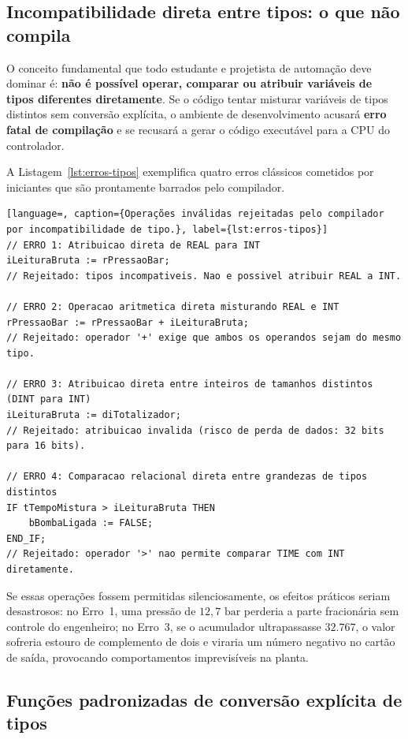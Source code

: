 \subsection{Incompatibilidade direta entre tipos: o que não compila}

O conceito fundamental que todo estudante e projetista de automação deve dominar é: \textbf{não é
possível operar, comparar ou atribuir variáveis de tipos diferentes diretamente}. Se o código tentar
misturar variáveis de tipos distintos sem conversão explícita, o ambiente de desenvolvimento
acusará \textbf{erro fatal de compilação} e se recusará a gerar o código executável para a CPU do
controlador.

A Listagem~\ref{lst:erros-tipos} exemplifica quatro erros clássicos cometidos por iniciantes que
são prontamente barrados pelo compilador.

\begin{lstlisting}[language=, caption={Operações inválidas rejeitadas pelo compilador por incompatibilidade de tipo.}, label={lst:erros-tipos}]
// ERRO 1: Atribuicao direta de REAL para INT
iLeituraBruta := rPressaoBar;
// Rejeitado: tipos incompativeis. Nao e possivel atribuir REAL a INT.

// ERRO 2: Operacao aritmetica direta misturando REAL e INT
rPressaoBar := rPressaoBar + iLeituraBruta;
// Rejeitado: operador '+' exige que ambos os operandos sejam do mesmo tipo.

// ERRO 3: Atribuicao direta entre inteiros de tamanhos distintos (DINT para INT)
iLeituraBruta := diTotalizador;
// Rejeitado: atribuicao invalida (risco de perda de dados: 32 bits para 16 bits).

// ERRO 4: Comparacao relacional direta entre grandezas de tipos distintos
IF tTempoMistura > iLeituraBruta THEN
    bBombaLigada := FALSE;
END_IF;
// Rejeitado: operador '>' nao permite comparar TIME com INT diretamente.
\end{lstlisting}

Se essas operações fossem permitidas silenciosamente, os efeitos práticos seriam desastrosos:
no Erro~1, uma pressão de $12,7\text{ bar}$ perderia a parte fracionária sem controle do
engenheiro; no Erro~3, se o acumulador ultrapassasse $32.767$, o valor sofreria estouro de
complemento de dois e viraria um número negativo no cartão de saída, provocando comportamentos
imprevisíveis na planta.

\subsection{Funções padronizadas de conversão explícita de tipos}

